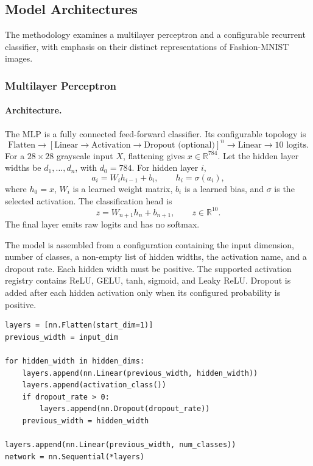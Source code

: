 \documentclass[11pt,a4paper]{article}
\begin{document}
\subsection{Model Architectures}

The methodology examines a multilayer perceptron and a configurable recurrent classifier, with emphasis on their distinct representations of Fashion-MNIST images.

\setcounter{subsubsection}{1}
\subsubsection{Multilayer Perceptron}
\label{sec:mlp-method}

\paragraph{Architecture.} The MLP is a fully connected feed-forward classifier. Its configurable topology is
\[
\text{Flatten} \rightarrow \left[\text{Linear}\rightarrow\text{Activation} \rightarrow\text{Dropout (optional)}\right]^n \rightarrow\text{Linear}\rightarrow 10\text{ logits}.
\]
For a \(28\times28\) grayscale input \(X\), flattening gives \(x\in\mathbb{R}^{784}\). Let the hidden layer widths be \(d_1,\ldots,d_n\), with \(d_0=784\). For hidden layer \(i\),
\[
a_i=W_i h_{i-1}+b_i,\qquad h_i=\sigma(a_i),
\]
where \(h_0=x\), \(W_i\) is a learned weight matrix, \(b_i\) is a learned bias, and \(\sigma\) is the selected activation. The classification head is
\[
z=W_{n+1}h_n+b_{n+1},\qquad z\in\mathbb{R}^{10}.
\]
The final layer emits raw logits and has no softmax.

The model is assembled from a configuration containing the input dimension, number of classes, a non-empty list of hidden widths, the activation name, and a dropout rate. Each hidden width must be positive. The supported activation registry contains ReLU, GELU, tanh, sigmoid, and Leaky ReLU. Dropout is added after each hidden activation only when its configured probability is positive.

\begin{lstlisting}[caption={MLP construction pattern used by the configurable classifier.},label={lst:mlp-build}]
layers = [nn.Flatten(start_dim=1)]
previous_width = input_dim

for hidden_width in hidden_dims:
    layers.append(nn.Linear(previous_width, hidden_width))
    layers.append(activation_class())
    if dropout_rate > 0:
        layers.append(nn.Dropout(dropout_rate))
    previous_width = hidden_width

layers.append(nn.Linear(previous_width, num_classes))
network = nn.Sequential(*layers)
\end{lstlisting}
\end{document}

